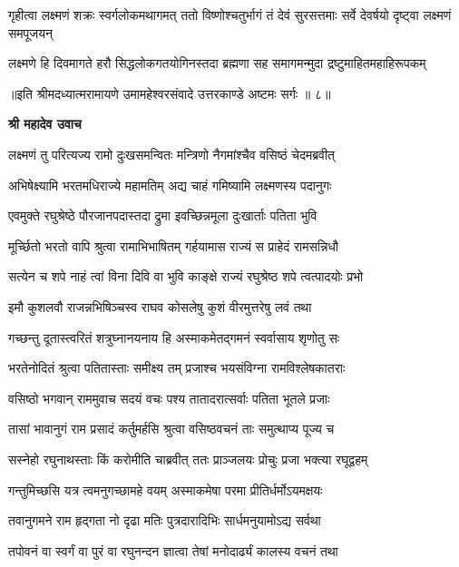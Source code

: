\threelineshloka
{गृहीत्वा लक्ष्मणं शक्रः स्वर्गलोकमथागमत्}
{ततो विष्णोश्चतुर्भागं तं देवं सुरसत्तमाः}
{सर्वे देवर्षयो दृष्ट्वा लक्ष्मणं समपूजयन्} %

\twolineshloka
{लक्ष्मणे हि दिवमागते हरौ सिद्धलोकगतयोगिनस्तदा}
{ब्रह्मणा सह समागमन्मुदा द्रष्टुमाहितमहाहिरूपकम्} %

{॥इति श्रीमदध्यात्मरामायणे उमामहेश्वरसंवादे उत्तरकाण्डे अष्टमः
सर्गः ॥ ८॥
}




\textbf{श्री महादेव उवाच}

\twolineshloka
{लक्ष्मणं तु परित्यज्य रामो दुःखसमन्वितः}
{मन्त्रिणो नैगमांश्चैव वसिष्ठं चेदमब्रवीत्} %

\twolineshloka
{अभिषेक्ष्यामि भरतमधिराज्ये महामतिम्}
{अद्य चाहं गमिष्यामि लक्ष्मणस्य पदानुगः} %

\twolineshloka
{एवमुक्ते रघुश्रेष्ठे पौरजानपदास्तदा}
{द्रुमा इवच्छिन्नमूला दुःखार्ताः पतिता भुवि} %

\twolineshloka
{मूर्च्छितो भरतो वापि श्रुत्वा रामाभिभाषितम्}
{गर्हयामास राज्यं स प्राहेदं रामसन्निधौ} %

\twolineshloka
{सत्येन च शपे नाहं त्वां विना दिवि वा भुवि}
{काङ्क्षे राज्यं रघुश्रेष्ठ शपे त्वत्पादयोः प्रभो} %

\twolineshloka
{इमौ कुशलवौ राजन्नभिषिञ्चस्व राघव}
{कोसलेषु कुशं वीरमुत्तरेषु लवं तथा} %

\twolineshloka
{गच्छन्तु दूतास्त्वरितं शत्रुघ्नानयनाय हि}
{अस्माकमेतद्गमनं स्वर्वासाय शृणोतु सः} %

\twolineshloka
{भरतेनोदितं श्रुत्वा पतितास्ताः समीक्ष्य तम्}
{प्रजाश्च भयसंविग्ना रामविश्लेषकातराः} %

\twolineshloka
{वसिष्ठो भगवान् राममुवाच सदयं वचः}
{पश्य तातादरात्सर्वाः पतिता भूतले प्रजाः} %

\twolineshloka
{तासां भावानुगं राम प्रसादं कर्तुमर्हसि}
{श्रुत्वा वसिष्ठवचनं ताः समुत्थाप्य पूज्य च} %

\twolineshloka
{सस्नेहो रघुनाथस्ताः किं करोमीति चाब्रवीत्}
{ततः प्राञ्जलयः प्रोचुः प्रजा भक्त्या रघूद्वहम्} %

\twolineshloka
{गन्तुमिच्छसि यत्र त्वमनुगच्छामहे वयम्}
{अस्माकमेषा परमा प्रीतिर्धर्मोऽयमक्षयः} %

\twolineshloka
{तवानुगमने राम हृद्गता नो दृढा मतिः}
{पुत्रदारादिभिः सार्धमनुयामोऽद्य सर्वथा} %

\twolineshloka
{तपोवनं वा स्वर्गं वा पुरं वा रघुनन्दन}
{ज्ञात्वा तेषां मनोदार्ढ्यं कालस्य वचनं तथा} %

